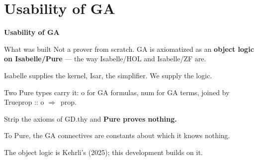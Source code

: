 \documentclass[aspectratio=169,11pt]{beamer}
\newcommand{\im}{\ensuremath{\Longrightarrow}}
\newcommand{\code}[1]{{\ttfamily\footnotesize #1}}
\newcommand{\key}[1]{{\color{accent}\textbf{#1}}}
\begin{document}
\section{Usability of GA}

\begin{frame}[plain]
  \vfill
  \begin{center}
    {\Huge\bfseries\color{accent} Usability of GA}
  \end{center}
  \vfill
\end{frame}

\begin{frame}{What was built}
  \vfill
  Not a prover from scratch. GA is axiomatized as an \key{object logic on
  Isabelle/Pure} --- the way Isabelle/HOL and Isabelle/ZF are.
  \vfill
  \begin{center}\small
    Isabelle supplies the kernel, Isar, the simplifier. We supply the logic.
  \end{center}
  \vfill
  \pause
  Two Pure types carry it: \code{o} for GA formulas, \code{num} for GA terms, joined
  by \code{Trueprop :: o \im\ prop}.
  \vfill
  \pause
  \begin{center}\Large
    Strip the axioms of \code{GD.thy} and \key{Pure proves nothing.}
  \end{center}
  \begin{center}\small
    To Pure, the GA connectives are constants about which it knows nothing.
  \end{center}
  \vfill
  \begin{center}\footnotesize
    The object logic is Kehrli's (2025); this development builds on it.
  \end{center}
\end{frame}
\end{document}
